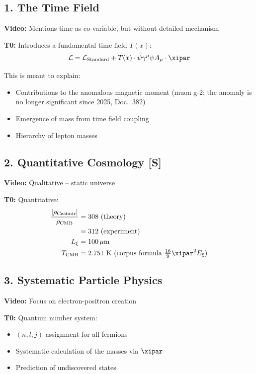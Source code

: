 	\subsection{1. The Time Field}
	
	\textbf{Video:} Mentions time as co-variable, but without detailed mechanism
	
	\textbf{T0:} Introduces a fundamental time field $T(x)$:
	\begin{equation}
		\mathcal{L} = \mathcal{L}_{\text{Standard}} + T(x) \cdot \bar{\psi}\gamma^\mu\psi A_\mu \cdot \xipar
	\end{equation}
	
	This is meant to explain:
	\begin{itemize}
		\item Contributions to the anomalous magnetic moment (muon g-2; the anomaly is no longer significant since 2025, Doc.~382)
		\item Emergence of mass from time field coupling
		\item Hierarchy of lepton masses
	\end{itemize}
	
	\subsection{2. Quantitative Cosmology [S]}
	
	\textbf{Video:} Qualitative -- static universe
	
	\textbf{T0:} Quantitative:
	\begin{align}
		\frac{|\rho_{\text{Casimir}}|}{\rho_{\text{CMB}}} &= 308 \text{ (theory)} \\
		&= 312 \text{ (experiment)} \\
		L_\xi &= 100 \, \mu\text{m} \\
		T_{\text{CMB}} &= 2.751 \text{ K (corpus formula } \tfrac{16}{9}\xipar^2 E_\xi\text{)}
	\end{align}
	
	\subsection{3. Systematic Particle Physics}
	
	\textbf{Video:} Focus on electron-positron creation
	
	\textbf{T0:} Quantum number system:
	\begin{itemize}
		\item $(n,l,j)$ assignment for all fermions
		\item Systematic calculation of the masses via $\xipar$
		\item Prediction of undiscovered states
	\end{itemize}
	
